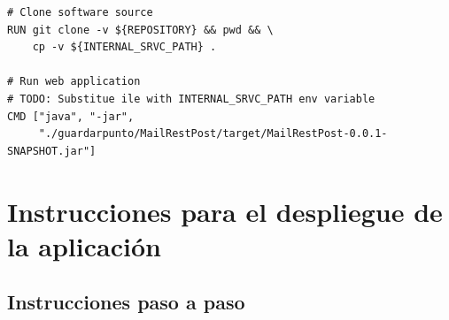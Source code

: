 \documentclass[12pt,spanish]{article}
\begin{document}
\begin{itemize}
\begin{verbatim}
# Clone software source
RUN git clone -v ${REPOSITORY} && pwd && \
    cp -v ${INTERNAL_SRVC_PATH} .

# Run web application
# TODO: Substitue ile with INTERNAL_SRVC_PATH env variable
CMD ["java", "-jar",
     "./guardarpunto/MailRestPost/target/MailRestPost-0.0.1-SNAPSHOT.jar"]
\end{verbatim}

\end{itemize}

\pagebreak
\section{Instrucciones para el despliegue de la aplicación}
\label{sec:instructions}

\subsection{Instrucciones paso a paso}
\end{document}
